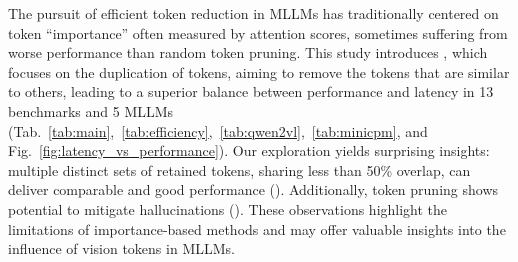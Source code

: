 The pursuit of efficient token reduction in MLLMs has traditionally centered on token ``importance'' often measured by attention scores, sometimes suffering from worse performance than random token pruning.
This study introduces \algname, which focuses on the duplication of tokens, aiming to remove the tokens that are similar to others, leading to a superior balance between performance and latency in 13 benchmarks and 5 MLLMs (Tab.~\ref{tab:main},~\ref{tab:efficiency},~\ref{tab:qwen2vl},~\ref{tab:minicpm}, and Fig.~\ref{fig:latency_vs_performance}). 
Our exploration yields surprising insights: multiple distinct sets of retained tokens, sharing less than 50\% overlap, can deliver comparable and good performance (). Additionally, token pruning shows potential to mitigate hallucinations (). These observations highlight the limitations of importance-based methods and may offer valuable insights into the influence of vision tokens in MLLMs.

